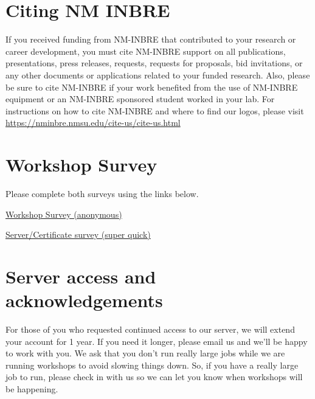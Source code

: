 \documentclass[
]{book}
\begin{document}
\hypertarget{citing-nm-inbre-1}{%
\chapter*{Citing NM INBRE}\label{citing-nm-inbre-1}}

If you received funding from NM-INBRE that contributed to your research or career development, you must cite NM-INBRE support on all publications, presentations, press releases, requests, requests for proposals, bid invitations, or any other documents or applications related to your funded research. Also, please be sure to cite NM-INBRE if your work benefited from the use of NM-INBRE equipment or an NM-INBRE sponsored student worked in your lab.
For instructions on how to cite NM-INBRE and where to find our logos, please visit \url{https://nminbre.nmsu.edu/cite-us/cite-us.html}

\hypertarget{workshop-survey}{%
\chapter*{Workshop Survey}\label{workshop-survey}}

Please complete both surveys using the links below.

\href{https://docs.google.com/forms/d/e/1FAIpQLScjtEvK-ywP9DEbTNsIcIn4YMe9evXvhmp-NVzn-t4MSakXig/viewform?usp=sf_link}{Workshop Survey (anonymous)}

\href{https://docs.google.com/forms/d/e/1FAIpQLSfGZwX2BL_ZyGgmvh4v41Q_886y-OiTESTbpvzoyR0J3BxC5Q/viewform?usp=sf_link}{Server/Certificate survey (super quick)}

\hypertarget{server-access-and-acknowledgements}{%
\chapter*{Server access and acknowledgements}\label{server-access-and-acknowledgements}}

For those of you who requested continued access to our server, we will extend your account for 1 year. If you need it longer, please email us and we'll be happy to work with you. We ask that you don't run really large jobs while we are running workshops to avoid slowing things down. So, if you have a really large job to run, please check in with us so we can let you know when workshops will be happening.
\end{document}

